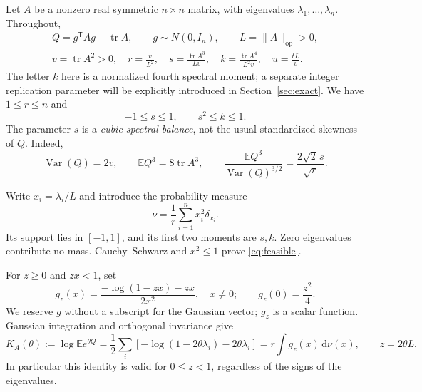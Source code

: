 \documentclass[11pt,letterpaper]{article}
\numberwithin{equation}{section}
\theoremstyle{definition}\newtheorem{definition}[theorem]{Definition}
\theoremstyle{remark}\newtheorem{remark}[theorem]{Remark}
\newcommand{\E}{\mathbb E}
\newcommand{\tr}{\operatorname{tr}}
\newcommand{\op}{\mathrm{op}}
\newcommand{\Var}{\operatorname{Var}}
\newcommand{\dd}{\,\mathrm d}
\begin{document}
Let $A$ be a nonzero real symmetric $n\times n$ matrix, with eigenvalues
$\lambda_1,\ldots,\lambda_n$. Throughout,
\begin{equation}\label{eq:notation}
 \begin{gathered}
 Q=g^{\mathsf T}Ag-\tr A,\qquad g\sim N(0,I_n),\qquad
 L=\|A\|_{\op}>0,\\
 v=\tr A^2>0,\quad r=\frac{v}{L^2},\quad
 s=\frac{\tr A^3}{Lv},\quad
 k=\frac{\tr A^4}{L^2v},\quad u=\frac{tL}{v}.
 \end{gathered}
\end{equation}
The letter $k$ here is a normalized fourth spectral moment; a separate
integer replication parameter will be explicitly introduced in
Section~\ref{sec:exact}. We have $1\le r\le n$ and
\begin{equation}\label{eq:feasible}
 -1\le s\le1,\qquad s^2\le k\le1.
\end{equation}
The parameter $s$ is a \emph{cubic spectral balance}, not the usual
standardized skewness of $Q$. Indeed,
\begin{equation}
 \Var(Q)=2v,\qquad \E Q^3=8\tr A^3,\qquad
 \frac{\E Q^3}{\Var(Q)^{3/2}}=\frac{2\sqrt2\,s}{\sqrt r}.
\end{equation}

Write $x_i=\lambda_i/L$ and introduce the probability measure
\begin{equation}\label{eq:measure}
 \nu=\frac1r\sum_{i=1}^n x_i^2\delta_{x_i}.
\end{equation}
Its support lies in $[-1,1]$, and its first two moments are $s,k$.
Zero eigenvalues contribute no mass. Cauchy--Schwarz and $x^2\le1$
prove \eqref{eq:feasible}.

For $z\ge0$ and $zx<1$, set
\begin{equation}\label{eq:kernel}
 g_z(x)=\frac{-\log(1-zx)-zx}{2x^2},\quad x\ne0;
 \qquad g_z(0)=\frac{z^2}{4}.
\end{equation}
We reserve $g$ without a subscript for the Gaussian vector; $g_z$ is a
scalar function. Gaussian integration and orthogonal invariance give
\begin{equation}\label{eq:cgf}
 K_A(\theta):=\log\E e^{\theta Q}
 =\frac12\sum_i[-\log(1-2\theta\lambda_i)-2\theta\lambda_i]
 =r\int g_z(x)\dd\nu(x),\qquad z=2\theta L.
\end{equation}
In particular this identity is valid for $0\le z<1$, regardless of
the signs of the eigenvalues.
\end{document}
